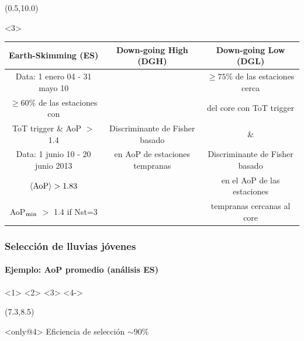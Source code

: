 \begin{frame}
\begin{center}
		\begin{textblock}{15}(0.5,10.0)
			\begin{exampleblock}{}<3>
				\begin{center}
					{\scriptsize
					\renewcommand{\arraystretch}{1.3}
						\begin{tabular}{|c|c|c|}
						\hline
						Earth-Skimming (ES)          & Down-going High (DGH)    & Down-going Low (DGL)                       \\
						\hline\hline
						Data: 1 enero 04 - 31 mayo 10 &                                      & $\geq 75\%$ de las estaciones cerca \\
						$\geq 60\%$ de las estaciones con  &                                      & del core con ToT trigger  \\
						ToT trigger \& AoP $>$ 1.4    & Discriminante de Fisher basado             &      \&                      \\
						\cline{1-1}
						Data: 1 junio 10 - 20 junio 2013   & en AoP de estaciones tempranas & Discriminante de Fisher basado  \\
						$\langle {\rm AoP} \rangle> 1.83$  &                                 &  en el AoP de las estaciones \\
						AoP$_{\rm min}$ $>$ 1.4 if Nst=3   &                                 & tempranas cercanas al core         \\
						\hline
						\end{tabular}
					}
				\end{center}
			\end{exampleblock}
		\end{textblock}
	\end{center}
\end{frame}

\begin{frame}
 \frametitle{Selecci\'on de lluvias j\'ovenes}
 \framesubtitle{Ejemplo: AoP promedio (an\'alisis ES)}
	\begin{center}
	<4->
	\end{center}
	
	\begin{textblock}{4.3}(7.3,8.5)
		\begin{alertblock}{}<only@4>
		\centering
	         Eficiencia de selecci\'on $\sim 90\%$	
		\end{alertblock}
	\end{textblock}
	
\end{frame}

